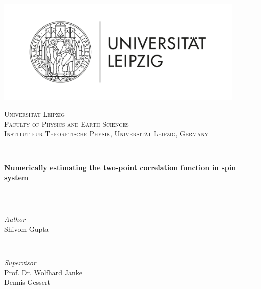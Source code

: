 \begin{titlepage}
    \newcommand{\HRule}{\rule{\linewidth}{0.5mm}}
    \centering

	\includegraphics[width=0.9\textwidth]{images/logo.png}

    \textsc{\LARGE Universität Leipzig}\\[1.5cm]
    \textsc{\Large Faculty of Physics and Earth Sciences}\\[0.5cm]
    \textsc{\Large \small Institut f\"ur Theoretische Physik, Universit\"at Leipzig, Germany}\\[0.5cm]

    \HRule\\[0.4cm]
    {\huge\bfseries Numerically estimating the two-point correlation function in spin system}\\[0.4cm]
    \HRule\\[1.5cm]

    \begin{minipage}{0.45\textwidth}
        \begin{flushleft} \large
            \textit{Author}\\
            Shivom Gupta
        \end{flushleft}
    \end{minipage}
    ~
    \begin{minipage}{0.45\textwidth}
        \begin{flushright} \large
            \textit{Supervisor}\\
            Prof. Dr. Wolfhard Janke\\
            Dennis Gessert
        \end{flushright}
    \end{minipage}\\[2cm]

    \vfill
\end{titlepage}
